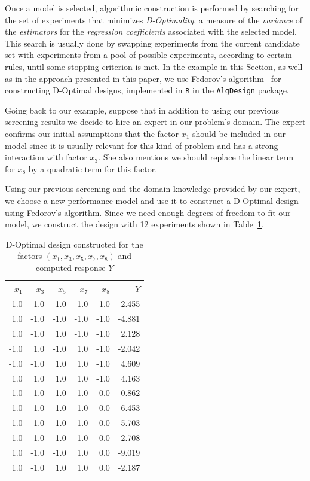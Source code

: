 \documentclass[conference]{IEEEtran}
\begin{document}
Once a model is selected, algorithmic construction is performed by searching for
the set of experiments that minimizes \emph{D-Optimality}, a measure of the
\emph{variance} of the \emph{estimators} for the \emph{regression coefficients} associated with
the selected model. This search is usually done by swapping experiments from the
current candidate set with experiments from a pool of possible experiments,
according to certain rules, until some stopping criterion is met. In the example
in this Section, as well as in the approach presented in this paper, we use
Fedorov's algorithm~\cite{fedorov1972theory} for constructing D-Optimal
designs, implemented in \texttt{R} in the \texttt{AlgDesign} package.

Going back to our example, suppose that in addition to using our previous
screening results we decide to hire an expert in our problem's domain. The
expert confirms our initial assumptions that the factor \(x_1\) should be included
in our model since it is usually relevant for this kind of problem and has a
strong interaction with factor \(x_3\). She also mentions we should replace
the linear term for \(x_8\) by a quadratic term for this factor.

Using our previous screening and the domain knowledge provided by our expert, we
choose a new performance model and use it to construct a D-Optimal design using
Fedorov's algorithm. Since we need enough degrees of freedom to fit our model,
we construct the design with 12 experiments shown in Table~\ref{tab:d_optimal}.

\begin{table}[ht]
\centering
\caption{D-Optimal design constructed for the factors $(x_1,x_3,x_5,x_7,x_8)$ and computed response $Y$}
\label{tab:d_optimal}
\begingroup\footnotesize
\begin{tabular}{rrrrrr}
  \toprule
$x_1$ & $x_3$ & $x_5$ & $x_7$ & $x_8$ & $Y$ \\
  \midrule
-1.0 & -1.0 & -1.0 & -1.0 & -1.0 & 2.455 \\
  1.0 & -1.0 & -1.0 & -1.0 & -1.0 & -4.881 \\
  1.0 & -1.0 & 1.0 & -1.0 & -1.0 & 2.128 \\
  -1.0 & 1.0 & -1.0 & 1.0 & -1.0 & -2.042 \\
  -1.0 & -1.0 & 1.0 & 1.0 & -1.0 & 4.609 \\
  1.0 & 1.0 & 1.0 & 1.0 & -1.0 & 4.163 \\
  1.0 & 1.0 & -1.0 & -1.0 & 0.0 & 0.862 \\
  -1.0 & -1.0 & 1.0 & -1.0 & 0.0 & 6.453 \\
  -1.0 & 1.0 & 1.0 & -1.0 & 0.0 & 5.703 \\
  -1.0 & -1.0 & -1.0 & 1.0 & 0.0 & -2.708 \\
  1.0 & -1.0 & -1.0 & 1.0 & 0.0 & -9.019 \\
  1.0 & -1.0 & 1.0 & 1.0 & 0.0 & -2.187 \\
   \bottomrule
\end{tabular}
\endgroup
\end{table}
\end{document}
